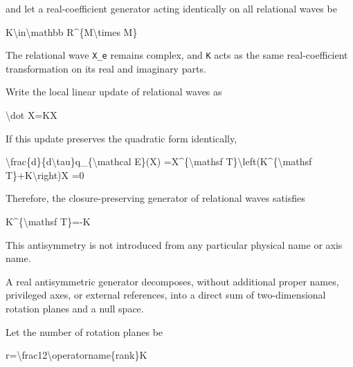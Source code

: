 \documentclass[
  a4paper,
]{article}
\newenvironment{Shaded}{}{}
\newcommand{\NormalTok}[1]{#1}
\begin{document}
and let a real-coefficient generator acting identically on all
relational waves be

\begin{Shaded}
\begin{Highlighting}[]
\NormalTok{K\textbackslash{}in\textbackslash{}mathbb R\^{}\{M\textbackslash{}times M\}}
\end{Highlighting}
\end{Shaded}

The relational wave \texttt{X\_e} remains complex, and \texttt{K} acts
as the same real-coefficient transformation on its real and imaginary
parts.

Write the local linear update of relational waves as

\begin{Shaded}
\begin{Highlighting}[]
\NormalTok{\textbackslash{}dot X=KX}
\end{Highlighting}
\end{Shaded}

If this update preserves the quadratic form identically,

\begin{Shaded}
\begin{Highlighting}[]
\NormalTok{\textbackslash{}frac\{d\}\{d\textbackslash{}tau\}q\_\{\textbackslash{}mathcal E\}(X)}
\NormalTok{=X\^{}\{\textbackslash{}mathsf T\}\textbackslash{}left(K\^{}\{\textbackslash{}mathsf T\}+K\textbackslash{}right)X}
\NormalTok{=0}
\end{Highlighting}
\end{Shaded}

Therefore, the closure-preserving generator of relational waves
satisfies

\begin{Shaded}
\begin{Highlighting}[]
\NormalTok{K\^{}\{\textbackslash{}mathsf T\}={-}K}
\end{Highlighting}
\end{Shaded}

This antisymmetry is not introduced from any particular physical name or
axis name.

A real antisymmetric generator decomposes, without additional proper
names, privileged axes, or external references, into a direct sum of
two-dimensional rotation planes and a null space.

Let the number of rotation planes be

\begin{Shaded}
\begin{Highlighting}[]
\NormalTok{r=\textbackslash{}frac12\textbackslash{}operatorname\{rank\}K}
\end{Highlighting}
\end{Shaded}
\end{document}
